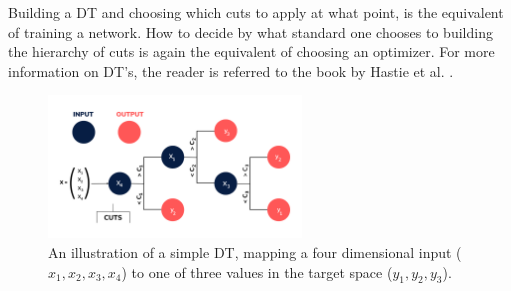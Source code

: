 Building a \ac{DT} and choosing which cuts to apply at what point, is the equivalent of training a 
network. How to decide by what standard one chooses to building the hierarchy of cuts is again the 
equivalent of choosing an optimizer. For more information on \ac{DT}'s, the reader is referred to the 
book by Hastie et al. \cite{huang_introduction_2014}.
\begin{figure}[H]
    \centering
    \includegraphics[width=0.6\textwidth]{Figures/Illustrations/DT.png}
    \caption{An illustration of a simple \acs{DT}, mapping a four dimensional input ($x_1,x_2,x_3,x_4$) 
    to one of three values in the target space ($y_1,y_2,y_3$).}
    \label{fig:DT}
\end{figure}
